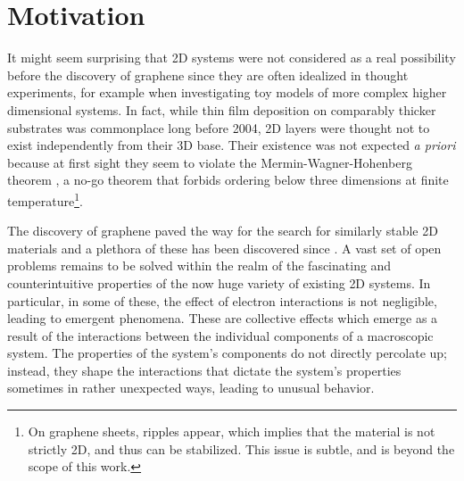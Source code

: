 \section{Motivation}
\label{sec:motivation}

It might seem surprising that \ac{2D} systems were not considered as a real possibility before the discovery of graphene since they are often idealized in thought experiments, for example when investigating toy models of more complex higher dimensional systems.
In fact, while thin film deposition on comparably thicker substrates was commonplace long before 2004, \ac{2D} layers were thought not to exist independently from their 3D base.
Their existence was not expected \emph{a priori} because at first sight they seem to violate the Mermin-Wagner-Hohenberg theorem \cite{mermin_absence_1966, coleman_there_1973, hohenberg_existence_1967}, a no-go theorem that forbids ordering below three dimensions at finite temperature\footnote{On graphene sheets, ripples appear, which implies that the material is not strictly \ac{2D}, and thus can be stabilized. This issue is subtle, and is beyond the scope of this work.}.

The discovery of graphene paved the way for the search for similarly stable \ac{2D} materials and a plethora of these has been discovered since \cite{ajayan_two-dimensional_2016}.
A vast set of open problems remains to be solved within the realm of the fascinating and counterintuitive properties of the now huge variety of existing \ac{2D} systems.
In particular, in some of these, the effect of electron interactions is not negligible, leading to emergent phenomena.
These are collective effects which emerge as a result of the interactions between the individual components of a macroscopic system.
The properties of the system's components do not directly percolate up; instead, they shape the interactions that dictate the system's properties sometimes in rather unexpected ways, leading to unusual behavior.

